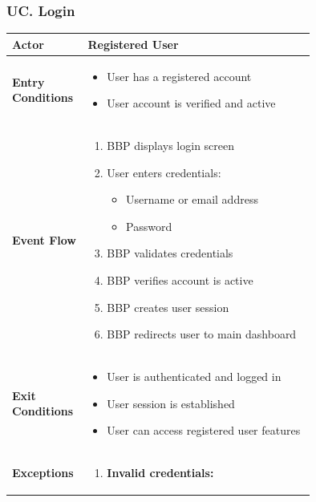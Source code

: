 \subsubsection*{UC\cuc . Login}
\begin{center}
    \begin{longtable}{|l|p{0.75\linewidth}|}
        \hline
        \textbf{Actor}            & Registered User \\
        \hline
        \textbf{Entry Conditions} & 
        \begin{itemize}
            \item User has a registered account
            \item User account is verified and active
        \end{itemize} \\
        \hline
        \textbf{Event Flow}       & 
        \begin{enumerate}
            \item BBP displays login screen
            \item User enters credentials:
            \begin{itemize}
                \item Username or email address
                \item Password
            \end{itemize}
            \item BBP validates credentials
            \item BBP verifies account is active
            \item BBP creates user session
            \item BBP redirects user to main dashboard
        \end{enumerate} \\
        \hline
        \textbf{Exit Conditions}   & 
        \begin{itemize}
            \item User is authenticated and logged in
            \item User session is established
            \item User can access registered user features
        \end{itemize} \\
        \hline
        \textbf{Exceptions}       & 
        \begin{enumerate}
            \item \textbf{Invalid credentials:}
            \begin{itemize}

\end{itemize}
\end{enumerate}
\end{longtable}
\end{center}
